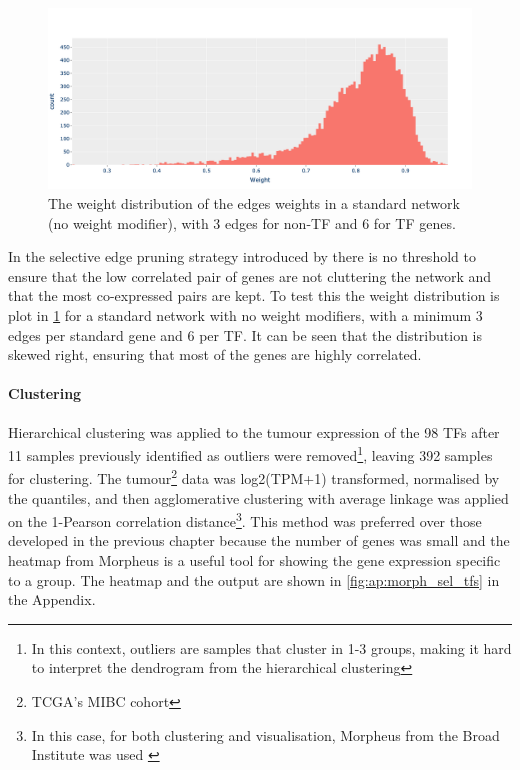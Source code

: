 \begin{figure}[!ht]   
\centering
\includegraphics[width=1.0\textwidth,height=1.0\textheight,keepaspectratio]{Sections/Network_I/Resources/selective_pruning/weight_distrib.png}
  \caption{The weight distribution of the edges weights in a standard network (no weight modifier), with 3 edges for non-TF and 6 for TF genes.}
\label{fig:N_I:weight_distrib}
\end{figure}

In the selective edge pruning strategy introduced by \citet{Care2019-ij} there is no threshold to ensure that the low correlated pair of genes are not cluttering the network and that the most co-expressed pairs are kept. To test this the weight distribution is plot in \cref{fig:N_I:weight_distrib} for a standard network with no weight modifiers, with a minimum 3 edges per standard gene and 6 per TF. It can be seen that the distribution is skewed right, ensuring that most of the genes are highly correlated.

\paragraph*{Clustering}


Hierarchical clustering was applied to the tumour expression of the 98 TFs after 11 samples previously identified as outliers were removed\footnote{In this context, outliers are samples that cluster in 1-3 groups, making it hard to interpret the dendrogram from the hierarchical clustering}, leaving 392 samples for clustering. The tumour\footnote{TCGA's MIBC cohort} data was log2(TPM+1) transformed, normalised by the quantiles, and then agglomerative clustering with average linkage was applied on the 1-Pearson correlation distance\footnote{In this case, for both clustering and visualisation, Morpheus from the Broad Institute was used \cite{noauthor_undated-uz}}. This method was preferred over those developed in the previous chapter because the number of genes was small and the heatmap from Morpheus is a useful tool for showing the gene expression specific to a group. The heatmap and the output are shown in \cref{fig:ap:morph_sel_tfs} in the Appendix.

